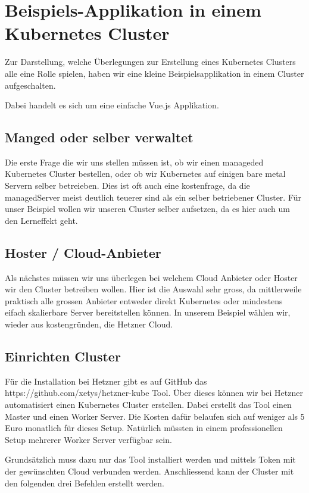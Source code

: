 \section{Beispiels-Applikation in einem Kubernetes Cluster}
Zur Darstellung, welche Überlegungen zur Erstellung eines Kubernetes Clusters alle eine Rolle spielen, haben wir eine kleine Beispielsapplikation in einem Cluster aufgeschalten.

Dabei handelt es sich um eine einfache Vue.js Applikation.

\subsection{Manged oder selber verwaltet}
Die erste Frage die wir uns stellen müssen ist, ob wir einen manageded Kubernetes Cluster bestellen, oder ob wir Kubernetes auf einigen bare metal Servern selber betreieben.
Dies ist oft auch eine kostenfrage, da die managedServer meist deutlich teuerer sind als ein selber betriebener Cluster. Für unser Beispiel wollen wir unseren Cluster selber aufsetzen, da es hier auch um den Lerneffekt geht.

\subsection{Hoster / Cloud-Anbieter}
Als nächstes müssen wir uns überlegen bei welchem Cloud Anbieter oder Hoster wir den Cluster betreiben wollen. Hier ist die Auswahl sehr gross, da mittlerweile praktisch alle grossen Anbieter entweder direkt Kubernetes oder mindestens eifach skalierbare Server bereitstellen können. 
In unserem Beispiel wählen wir, wieder aus kostengründen, die Hetzner Cloud.

\subsection{Einrichten Cluster}
Für die Installation bei Hetzner gibt es auf GitHub das https://github.com/xetys/hetzner-kube Tool. Über dieses können wir bei Hetzner automatisiert einen Kubernetes Cluster erstellen. Dabei erstellt das Tool einen Master und einen Worker Server. Die Kosten dafür belaufen sich auf weniger als 5 Euro monatlich für dieses Setup. Natürlich müssten in einem professionellen Setup mehrerer Worker Server verfügbar sein.

Grundsätzlich muss dazu nur das Tool installiert werden und mittels Token mit der gewünschten Cloud verbunden werden. Anschliessend kann der Cluster mit den folgenden drei Befehlen erstellt werden.


